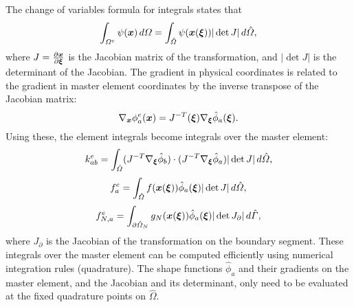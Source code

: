 \documentclass{article}
\renewcommand{\vec}{\vectorsym}
\begin{document}
The change of variables formula for integrals states that
$$ \int_{\Omega^e} \psi(\vec{x}) \, d\Omega = \int_{\hat{\Omega}} \psi(\vec{x}(\vec{\xi})) |\det J| \, d\hat{\Omega}, $$
where $J = \frac{\partial \vec{x}}{\partial \vec{\xi}}$ is the Jacobian matrix of the transformation, and $|\det J|$ is the determinant of the Jacobian.
The gradient in physical coordinates is related to the gradient in master element coordinates by the inverse transpose of the Jacobian matrix:
$$ \nabla_{\vec{x}} \phi_a^e(\vec{x}) = J^{-T}(\vec{\xi}) \nabla_{\vec{\xi}} \hat{\phi}_a(\vec{\xi}). $$
Using these, the element integrals become integrals over the master element:
$$ k_{ab}^e = \int_{\hat{\Omega}} (J^{-T} \nabla_{\vec{\xi}} \hat{\phi}_b) \cdot (J^{-T} \nabla_{\vec{\xi}} \hat{\phi}_a) |\det J| \, d\hat{\Omega}, $$
$$ f_a^e = \int_{\hat{\Omega}} f(\vec{x}(\vec{\xi})) \hat{\phi}_a(\vec{\xi}) |\det J| \, d\hat{\Omega}, $$
$$ f_{N,a}^e = \int_{\partial\hat{\Omega}_N} g_N(\vec{x}(\vec{\xi})) \hat{\phi}_a(\vec{\xi}) |\det J_{\partial}| \, d\hat{\Gamma}, $$
where $J_\partial$ is the Jacobian of the transformation on the boundary segment. These integrals over the master element can be computed efficiently using numerical integration rules (quadrature). The shape functions $\hat{\phi}_a$ and their gradients on the master element, and the Jacobian and its determinant, only need to be evaluated at the fixed quadrature points on $\hat{\Omega}$.
\end{document}
